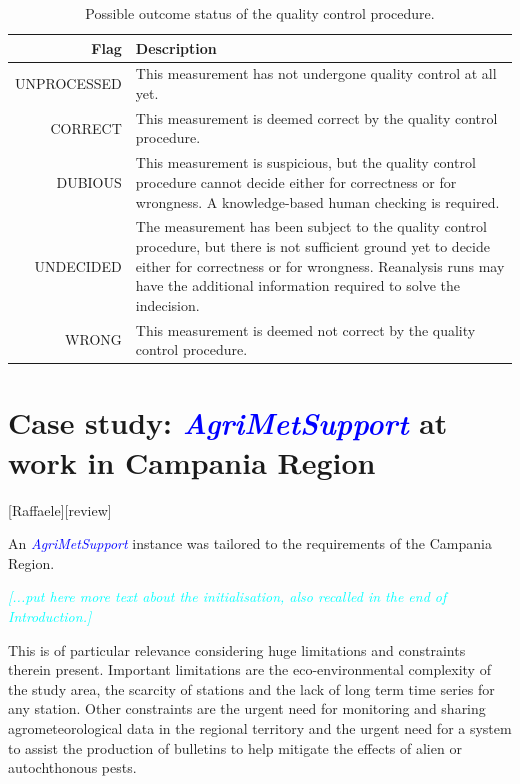 \documentclass[authoryear,preprint,review,12pt]{elsarticle}
\newcommand{\update}[1]{\emph{\textcolor{blue}{#1}}}
\newcommand{\review}[1]{\emph{\textcolor{cyan}{#1}}}
\newcommand{\gci}{\update{AgriMetSupport}\xspace}
\begin{document}
\begin{table}[]
    \begin{scriptsize}
    \centering
    \begin{tabular}{r p{10cm}}
    \hline
    Flag & Description \\
    \hline
	UNPROCESSED & This measurement has not undergone quality control at all yet.\\
	CORRECT & This measurement is deemed correct by the quality control procedure.\\
	DUBIOUS & This measurement is suspicious, but the quality control procedure cannot decide either for correctness or for wrongness. A knowledge-based human checking is required. \\
	UNDECIDED & The measurement has been subject to the quality control procedure, but there is not sufficient ground yet to decide either for correctness or for wrongness. Reanalysis runs may have the additional information required to solve the indecision.\\
	WRONG & This measurement is deemed not correct by the quality control procedure.\\
    \hline
    \end{tabular}
    \caption{Possible outcome status of the quality control procedure.}
    \label{tab:qcheckOutcomeFlagsSummary}
    \end{scriptsize}
\end{table}


\section{Case study: \gci at work in Campania Region}[Raffaele][review] \label{sec:casestudy}

An \gci instance was tailored to the requirements of the Campania Region.

\review{ [...put here more text about the initialisation, also recalled in the end of Introduction.] }

This is of particular relevance considering huge limitations and constraints therein present.
Important limitations are the eco-environmental complexity of the study area, the scarcity of stations and the lack of long term time series for any station.
Other constraints are the urgent need for monitoring and sharing agrometeorological data in the regional territory %
and the urgent need for a system to assist the production of bulletins to help mitigate the effects of alien or autochthonous pests.
 
\end{document}
